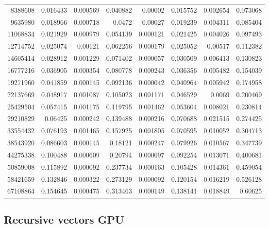 \begin{longtable}{r r r r r r r r}
8388608 & 0.016433 & 0.000569 & 0.040882 & 0.00002 & 0.015752 & 0.002654 & 0.073068 \\
9635980 & 0.018966 & 0.000718 & 0.0472 & 0.00027 & 0.019239 & 0.004311 & 0.085404 \\
11068834 & 0.021929 & 0.000979 & 0.054139 & 0.000121 & 0.021425 & 0.004026 & 0.097493 \\
12714752 & 0.025074 & 0.00121 & 0.062256 & 0.000179 & 0.025052 & 0.00517 & 0.112382 \\
14605414 & 0.028912 & 0.001229 & 0.071402 & 0.000057 & 0.030509 & 0.006413 & 0.130823 \\
16777216 & 0.036905 & 0.000354 & 0.080778 & 0.000243 & 0.036356 & 0.005482 & 0.154039 \\
19271960 & 0.041859 & 0.000145 & 0.092136 & 0.000042 & 0.040964 & 0.005942 & 0.174958 \\
22137669 & 0.048917 & 0.001087 & 0.105023 & 0.001171 & 0.046529 & 0.0069 & 0.200469 \\
25429504 & 0.057415 & 0.001175 & 0.119795 & 0.001462 & 0.053604 & 0.008021 & 0.230814 \\
29210829 & 0.06425 & 0.000242 & 0.139488 & 0.000216 & 0.070688 & 0.021515 & 0.274425 \\
33554432 & 0.076193 & 0.001465 & 0.157925 & 0.001805 & 0.070595 & 0.010052 & 0.304713 \\
38543920 & 0.086603 & 0.000145 & 0.18121 & 0.000247 & 0.079926 & 0.010567 & 0.347739 \\
44275338 & 0.100488 & 0.000609 & 0.20794 & 0.000097 & 0.092254 & 0.013071 & 0.400681 \\
50859008 & 0.115892 & 0.000092 & 0.237734 & 0.000163 & 0.105428 & 0.014361 & 0.459054 \\
58421659 & 0.132846 & 0.000322 & 0.273129 & 0.000092 & 0.120154 & 0.016219 & 0.526128 \\
67108864 & 0.154645 & 0.000475 & 0.313463 & 0.000149 & 0.138141 & 0.018849 & 0.60625 \\
\end{longtable}

\subsection*{Recursive vectors GPU}

